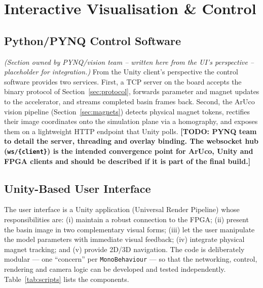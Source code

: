 \documentclass[11pt,a4paper]{article}
\newcommand{\todo}[1]{\textcolor{red!75!black}{\textbf{[TODO: #1]}}}
\newcommand{\owned}[1]{\textit{\small(Section owned by #1 -- placeholder for integration.)}}
\begin{document}
\section{Interactive Visualisation \& Control}

\subsection{Python/PYNQ Control Software}
\owned{PYNQ/vision team -- written here from the UI's perspective}
From the Unity client's perspective the control software provides two services.
First, a TCP server on the board accepts the binary protocol of
Section~\ref{sec:protocol}, forwards parameter and magnet updates to the
accelerator, and streams completed basin frames back. Second, the ArUco vision
pipeline (Section~\ref{sec:magnets}) detects physical magnet tokens, rectifies
their image coordinates onto the simulation plane via a homography, and exposes
them on a lightweight HTTP endpoint that Unity polls. \todo{PYNQ team to detail
the server, threading and overlay binding. The websocket hub
(\texttt{ws/\{client\}}) is the intended convergence point for ArUco, Unity and
FPGA clients and should be described if it is part of the final build.}

\subsection{Unity-Based User Interface}
\label{sec:unity}

The user interface is a Unity application (Universal Render Pipeline) whose
responsibilities are: (i) maintain a robust connection to the FPGA;
(ii) present the basin image in two complementary visual forms; (iii) let the
user manipulate the model parameters with immediate visual feedback;
(iv) integrate physical magnet tracking; and (v) provide 2D/3D navigation.
The code is deliberately modular --- one ``concern'' per
\texttt{MonoBehaviour} --- so that the networking, control, rendering and
camera logic can be developed and tested independently. Table~\ref{tab:scripts}
lists the components.
\end{document}
